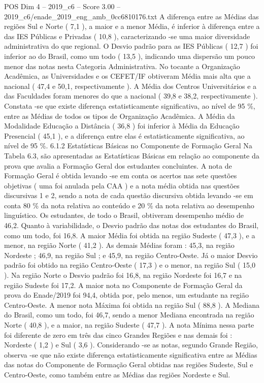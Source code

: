 \begin{textsample}{POS Dim 4 – 2019\_c6 – Score 3.00 – 2019\_c6/enade\_2019\_eng\_amb\_0cc6810176.txt}
A diferença entre as Médias das regiões Sul e Norte ( 7,1 ), a maior e a menor Média, é inferior à diferença entre a das IES Públicas e Privadas ( 10,8 ), caracterizando -se uma maior diversidade administrativa do que regional.
O Desvio padrão para as IES Públicas ( 12,7 ) foi inferior ao do Brasil, como um todo ( 13,5 ), indicando uma dispersão um pouco menor das notas nesta Categoria Administrativa.
No tocante a Organização Acadêmica, as Universidades e os CEFET/IF obtiveram Média mais alta que a nacional ( 47,4 e 50,1, respectivamente ).
A Média dos Centros Universitários e a das Faculdades foram menores do que a nacional ( 39,8 e 38,2, respectivamente ).
Constata -se que existe diferença estatisticamente significativa, ao nível de 95 \%, entre as Médias de todos os tipos de Organização Acadêmica.
A Média da Modalidade Educação a Distância ( 36,8 ) foi inferior à Média da Educação Presencial ( 45,1 ), e a diferença entre elas é estatisticamente significativa, ao nível de 95 \%. 6.1.2 Estatísticas Básicas no Componente de Formação Geral Na Tabela 6.3, são apresentadas as Estatísticas Básicas em relação ao componente da prova que avalia a Formação Geral dos estudantes concluintes.
A nota de Formação Geral é obtida levando -se em conta os acertos nas sete questões objetivas ( uma foi anulada pela CAA ) e a nota média obtida nas questões discursivas 1 e 2, sendo a nota de cada questão discursiva obtida levando -se em conta 80 \% da nota relativa ao conteúdo e 20 \% da nota relativa ao desempenho linguístico.
Os estudantes, de todo o Brasil, obtiveram desempenho médio de 46,2.
Quanto à variabilidade, o Desvio padrão das notas dos estudantes do Brasil, como um todo, foi 16,8.
A maior Média foi obtida na região Sudeste ( 47,3 ), e a menor, na região Norte ( 41,2 ).
As demais Médias foram : 45,3, na região Nordeste ; 46,9, na região Sul ; e 45,9, na região Centro-Oeste.
Já o maior Desvio padrão foi obtido na região Centro-Oeste ( 17,3 ) e o menor, na região Sul ( 15,0 ).
Na região Norte o Desvio padrão foi 16,8, na região Nordeste foi 16,7 e na região Sudeste foi 17,2.
A maior nota no Componente de Formação Geral da prova do Enade/2019 foi 94,4, obtida por, pelo menos, um estudante na região Centro-Oeste.
A menor nota Máxima foi obtida na região Sul ( 88,8 ).
A Mediana do Brasil, como um todo, foi 46,7, sendo a menor Mediana encontrada na região Norte ( 40,8 ), e a maior, na região Sudeste ( 47,7 ).
A nota Mínima nessa parte foi diferente de zero em três das cinco Grandes Regiões e nas demais foi : Nordeste ( 1,2 ) e Sul ( 3,6 ).
Considerando -se as notas, segundo Grande Região, observa -se que não existe diferença estatisticamente significativa entre as Médias das notas do Componente de Formação Geral obtidas nas regiões Sudeste, Sul e Centro-Oeste, como também entre as Médias das regiões Nordeste e Sul.

\end{textsample}
